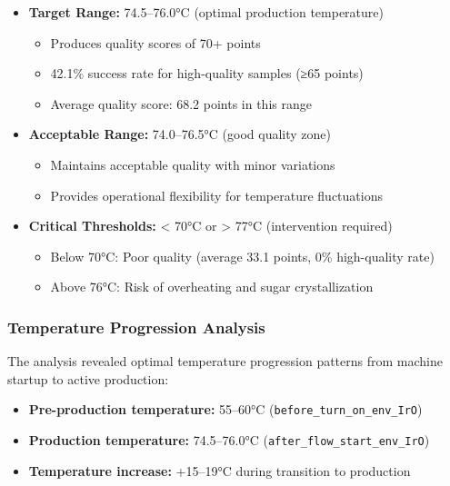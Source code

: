 \begin{itemize}
    \item \textbf{Target Range:} 74.5--76.0°C (optimal production temperature)
    \begin{itemize}
        \item Produces quality scores of 70+ points
        \item 42.1\% success rate for high-quality samples (≥65 points)
        \item Average quality score: 68.2 points in this range
    \end{itemize}
    
    \item \textbf{Acceptable Range:} 74.0--76.5°C (good quality zone)
    \begin{itemize}
        \item Maintains acceptable quality with minor variations
        \item Provides operational flexibility for temperature fluctuations
    \end{itemize}
    
    \item \textbf{Critical Thresholds:} < 70°C or > 77°C (intervention required)
    \begin{itemize}
        \item Below 70°C: Poor quality (average 33.1 points, 0\% high-quality rate)
        \item Above 76°C: Risk of overheating and sugar crystallization
    \end{itemize}
\end{itemize}

\subsubsection{Temperature Progression Analysis}

The analysis revealed optimal temperature progression patterns from machine startup to active production:

\begin{itemize}
    \item \textbf{Pre-production temperature:} 55--60°C (\texttt{before\_turn\_on\_env\_IrO})
    \item \textbf{Production temperature:} 74.5--76.0°C (\texttt{after\_flow\_start\_env\_IrO})
    \item \textbf{Temperature increase:} +15--19°C during transition to production
\end{itemize}

